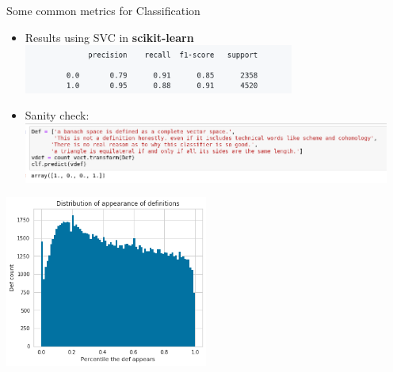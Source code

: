 \documentclass[10pt]{beamer}
\begin{document}
\begin{frame}{Some common metrics for Classification}
    \begin{itemize}
    \item Results using SVC in \textbf{scikit-learn}
    \includegraphics[width=0.7\textwidth]{class_results_svc.png}
    \item Sanity check:
    \includegraphics[width=0.95\textwidth]{sanity_check.png}
    \end{itemize}
    \begin{center}
     \includegraphics[width=0.5\textwidth]{def_appear_hist.png}
    \end{center}
\end{frame}
\end{document}
